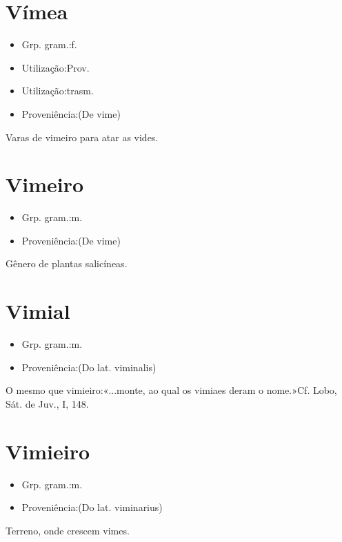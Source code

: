 \documentclass{article}
\begin{document}
\section{Vímea}
\begin{itemize}
\item {Grp. gram.:f.}
\end{itemize}
\begin{itemize}
\item {Utilização:Prov.}
\end{itemize}
\begin{itemize}
\item {Utilização:trasm.}
\end{itemize}
\begin{itemize}
\item {Proveniência:(De \textunderscore vime\textunderscore )}
\end{itemize}
Varas de vimeiro para atar as vides.
\section{Vimeiro}
\begin{itemize}
\item {Grp. gram.:m.}
\end{itemize}
\begin{itemize}
\item {Proveniência:(De \textunderscore vime\textunderscore )}
\end{itemize}
Gênero de plantas salicíneas.
\section{Vimial}
\begin{itemize}
\item {Grp. gram.:m.}
\end{itemize}
\begin{itemize}
\item {Proveniência:(Do lat. \textunderscore viminalis\textunderscore )}
\end{itemize}
O mesmo que \textunderscore vimieiro\textunderscore :«\textunderscore ...monte, ao qual os vimiaes deram o nome.\textunderscore »Cf. Lobo, \textunderscore Sát. de Juv.\textunderscore , I, 148.
\section{Vimieiro}
\begin{itemize}
\item {Grp. gram.:m.}
\end{itemize}
\begin{itemize}
\item {Proveniência:(Do lat. \textunderscore viminarius\textunderscore )}
\end{itemize}
Terreno, onde crescem vimes.
\end{document}
